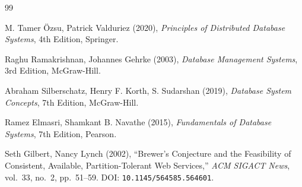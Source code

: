 \documentclass[12pt,a4paper]{report}
\begin{document}
\begin{thebibliography}{99}

M. Tamer Özsu, Patrick Valduriez (2020),
\textit{Principles of Distributed Database Systems}, 4th Edition, Springer.

Raghu Ramakrishnan, Johannes Gehrke (2003),
\textit{Database Management Systems}, 3rd Edition, McGraw-Hill.

Abraham Silberschatz, Henry F. Korth, S. Sudarshan (2019),
\textit{Database System Concepts}, 7th Edition, McGraw-Hill.

Ramez Elmasri, Shamkant B. Navathe (2015),
\textit{Fundamentals of Database Systems}, 7th Edition, Pearson.

Seth Gilbert, Nancy Lynch (2002),
``Brewer's Conjecture and the Feasibility of Consistent, Available, Partition-Tolerant Web Services,''
\textit{ACM SIGACT News}, vol.~33, no.~2, pp.~51--59. DOI: \texttt{10.1145/564585.564601}.

\end{thebibliography}
\end{document}
